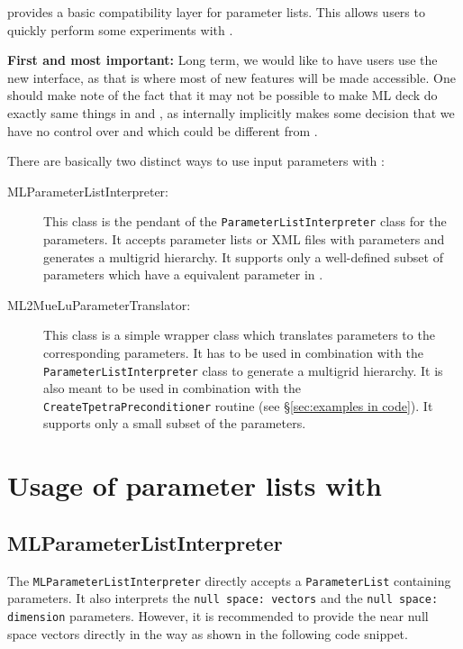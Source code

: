 
\label{sec:ml_options}
\muelu provides a basic compatibility layer for \ml parameter lists. This allows \ml users to quickly perform some experiments with \muelu.

\textbf{First and most important: } Long term, we would like to have users use the new \muelu interface, as that is where most of new features will be made accessible. One should make note of the fact that it may not be possible to make ML deck do exactly same things in \ml and \muelu, as internally \ml implicitly makes some decision that we have no control over and which could be different from \muelu.

\noindent There are basically two distinct ways to use \ml input parameters with \muelu:
\begin{description}
\item[MLParameterListInterpreter:] This class is the pendant of the \texttt{ParameterListInterpreter} class for the \muelu parameters. It accepts parameter lists or XML files with \ml parameters and generates a \muelu multigrid hierarchy. It supports only a well-defined subset of \ml parameters which have a equivalent parameter in \muelu.
\item[ML2MueLuParameterTranslator:] This class is a simple wrapper class which translates \ml parameters to the corresponding \muelu parameters. It has to be used in combination with the \muelu \texttt{ParameterListInterpreter} class to generate a \muelu multigrid hierarchy. It is also meant to be used in combination with the \texttt{CreateTpetraPreconditioner} routine (see \S\ref{sec:examples in code}). It supports only a small subset of the \ml parameters.
\end{description}

\section{Usage of \ml parameter lists with \muelu}

\subsection{MLParameterListInterpreter}

The \texttt{MLParameterListInterpreter} directly accepts a \texttt{ParameterList} containing \ml parameters. It also interprets the \texttt{null space: vectors} and the \texttt{null space: dimension} \ml parameters. However, it is recommended to provide the near null space vectors directly in the \muelu way as shown in the following code snippet.

